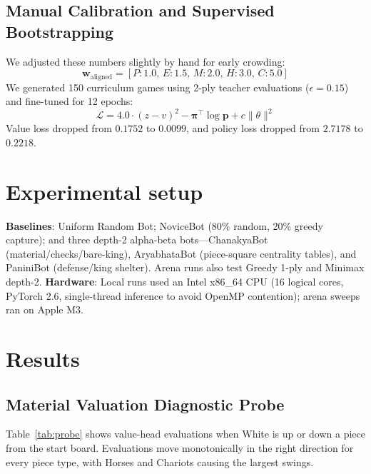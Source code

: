 \documentclass[11pt,a4paper,twocolumn]{article}
\begin{document}
\subsection{Manual Calibration and Supervised Bootstrapping}
We adjusted these numbers slightly by hand for early crowding:
\begin{equation}
\mathbf{w}_{\text{aligned}} = [P{:}1.0, \, E{:}1.5, \, M{:}2.0, \, H{:}3.0, \, C{:}5.0]
\end{equation}
We generated 150 curriculum games using 2-ply teacher evaluations ($\epsilon = 0.15$) and fine-tuned for 12 epochs:
\begin{equation}
\mathcal{L} = 4.0 \cdot (z - v)^2 - \boldsymbol{\pi}^\top \log \mathbf{p} + c \|\theta\|^2
\end{equation}
Value loss dropped from $0.1752$ to $0.0099$, and policy loss dropped from $2.7178$ to $0.2218$.

\section{Experimental setup}
\textbf{Baselines}: Uniform Random Bot; NoviceBot (80\% random, 20\% greedy capture); and three depth-2 alpha-beta bots---ChanakyaBot (material/checks/bare-king), AryabhataBot (piece-square centrality tables), and PaniniBot (defense/king shelter). Arena runs also test Greedy 1-ply and Minimax depth-2.
\textbf{Hardware}: Local runs used an Intel x86\_64 CPU (16 logical cores, PyTorch 2.6, single-thread inference to avoid OpenMP contention); arena sweeps ran on Apple M3.

\section{Results}

\subsection{Material Valuation Diagnostic Probe}
Table~\ref{tab:probe} shows value-head evaluations when White is up or down a piece from the start board. Evaluations move monotonically in the right direction for every piece type, with Horses and Chariots causing the largest swings.
\end{document}
